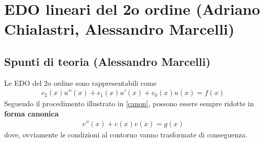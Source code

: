 \section{EDO lineari del 2o ordine (Adriano Chialastri, Alessandro Marcelli)}


\subsection{Spunti di teoria (Alessandro Marcelli)}

Le EDO del 2o ordine sono rappresentabili come
\begin{align}
	c_2(x) u''(x) + c_1(x) u'(x) + c_0(x)u(x) = f(x)
\end{align}
Seguendo il procedimento illustrato in \ref{canon}, possono essere sempre ridotte in \textbf{forma canonica}
\begin{align}
	v''(x) + c(x)v(x) = g(x)
\end{align}
dove, ovviamente le condizioni al contorno vanno trasformate di conseguenza.

